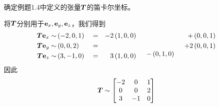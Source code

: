 \begin{example}
	确定例题1.4中定义的张量$\bb{T}$的笛卡尔坐标。
\end{example}
\begin{solution}
	将$\bb{T}$分别用于$\bf{e}_x,\bf{e}_y,\bf{e}_z$，我们得到
	\begin{equation*}
		\begin{matrix}
			\begin{aligned}
			\bb{T}\bf{e}_x\sim &\left( -2,0,1 \right) &&=\\
			\bb{T}\bf{e}_y\sim &\left( 0,0,2 \right) &&=\\
			\bb{T}\bf{e}_z\sim &\left( 3,-1,0 \right) &&=\\
		\end{aligned}&		\begin{aligned}
			-2&\left( 1,0,0 \right)\\
			\\
			3&\left( 1,0,0 \right)\\
		\end{aligned}&		\begin{array}{c}
			\\
			\\
			-\left( 0,1,0 \right)\\
		\end{array}&		\begin{aligned}
			+&\left( 0,0,1 \right)\\
			+2&\left( 0,0,1 \right)\\
			\\
		\end{aligned}\\
		\end{matrix}
	\end{equation*}
	因此
	\begin{equation*}
		\bb{T}\sim \left[ \begin{matrix}
			-2&		0&		1\\
			0&		0&		2\\
			3&		-1&		0\\
		\end{matrix} \right] 
	\end{equation*}
\end{solution}

